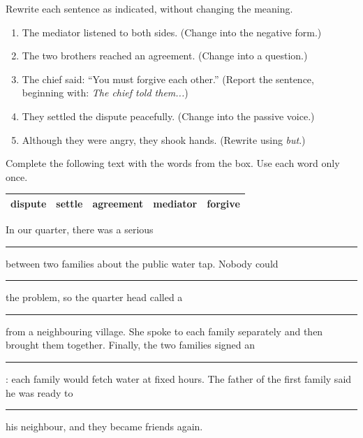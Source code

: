 \documentclass[11pt]{article}
\begin{document}
\begin{exercice}
Rewrite each sentence as indicated, without changing the meaning.

\begin{enumerate}
\item The mediator listened to both sides. (Change into the negative form.)
\item The two brothers reached an agreement. (Change into a question.)
\item The chief said: “You must forgive each other.” (Report the sentence, beginning with: \emph{The chief told them...})
\item They settled the dispute peacefully. (Change into the passive voice.)
\item Although they were angry, they shook hands. (Rewrite using \emph{but}.)
\end{enumerate}
\end{exercice}

\begin{exercice}
Complete the following text with the words from the box. Use each word only once.

\begin{center}
\begin{tabular}{|c|c|c|c|c|}
\hline
\rowcolor{popblueL} dispute & settle & agreement & mediator & forgive \\
\hline
\end{tabular}
\end{center}

\begin{textebox}
In our quarter, there was a serious \rule{2cm}{0.4pt} between two families about the public water tap. Nobody could \rule{2cm}{0.4pt} the problem, so the quarter head called a \rule{2cm}{0.4pt} from a neighbouring village. She spoke to each family separately and then brought them together. Finally, the two families signed an \rule{2cm}{0.4pt}: each family would fetch water at fixed hours. The father of the first family said he was ready to \rule{2cm}{0.4pt} his neighbour, and they became friends again.
\end{textebox}
\end{exercice}
\end{document}
